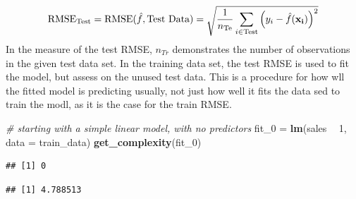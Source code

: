 \documentclass[]{report}
\newenvironment{Shaded}{\begin{snugshade}}{\end{snugshade}}
\newcommand{\KeywordTok}[1]{\textcolor[rgb]{0.13,0.29,0.53}{\textbf{#1}}}
\newcommand{\DataTypeTok}[1]{\textcolor[rgb]{0.13,0.29,0.53}{#1}}
\newcommand{\DecValTok}[1]{\textcolor[rgb]{0.00,0.00,0.81}{#1}}
\newcommand{\StringTok}[1]{\textcolor[rgb]{0.31,0.60,0.02}{#1}}
\newcommand{\CommentTok}[1]{\textcolor[rgb]{0.56,0.35,0.01}{\textit{#1}}}
\newcommand{\OperatorTok}[1]{\textcolor[rgb]{0.81,0.36,0.00}{\textbf{#1}}}
\newcommand{\NormalTok}[1]{#1}
\begin{document}
\[
\text{RMSE}_{\text{Test}} = \text{RMSE}(\hat{f}, \text{Test Data}) = \sqrt{\frac{1}{n_{\text{Te}}}\displaystyle\sum_{i \in \text{Test}}^{}\left(y_i - \hat{f}(\bf{x}_i)\right)^2}
\] In the measure of the test RMSE, \(n_{Tr}\) demonstrates the number
of observations in the given test data set. In the training data set,
the test RMSE is used to fit the model, but assess on the unused test
data. This is a procedure for how wll the fitted model is predicting
usually, not just how well it fits the data sed to train the modl, as it
is the case for the train RMSE.

\begin{Shaded}
\begin{Highlighting}[]
\CommentTok{# starting with a simple linear model, with no predictors}
\NormalTok{fit_}\DecValTok{0}\NormalTok{ =}\StringTok{ }\KeywordTok{lm}\NormalTok{(sales }\OperatorTok{~}\StringTok{ }\DecValTok{1}\NormalTok{, }\DataTypeTok{data =}\NormalTok{ train_data)}
\KeywordTok{get_complexity}\NormalTok{(fit_}\DecValTok{0}\NormalTok{)}
\end{Highlighting}
\end{Shaded}

\begin{verbatim}
## [1] 0
\end{verbatim}

\begin{Shaded}
\end{Shaded}

\begin{verbatim}
## [1] 4.788513
\end{verbatim}

\begin{Shaded}
\end{Shaded}
\end{document}
